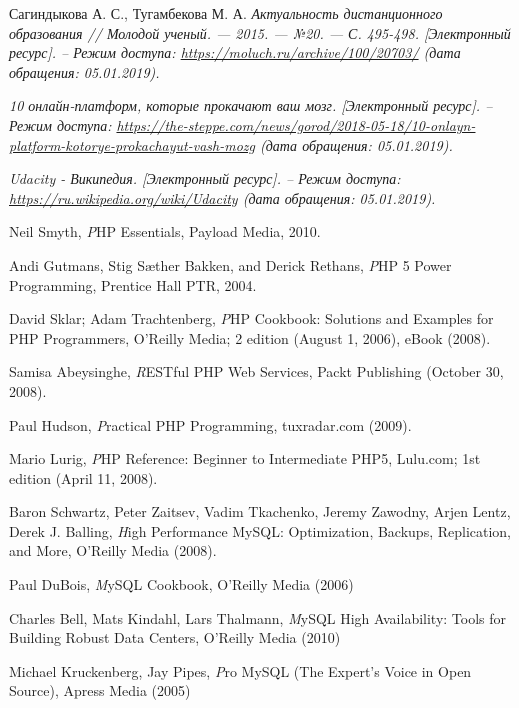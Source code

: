 \begin{thebibliography}{}

Сагиндыкова А. С., Тугамбекова М. А.
\emph{Актуальность дистанционного образования // Молодой ученый. — 2015. — №20. — С. 495-498.
[Электронный ресурс]. – Режим доступа:
\href{https://moluch.ru/archive/100/20703/}{https://moluch.ru/archive/100/20703/}
(дата обращения: 05.01.2019).}

\emph{10 онлайн-платформ, которые прокачают ваш мозг.
[Электронный ресурс]. – Режим доступа:
\href{https://the-steppe.com/news/gorod/2018-05-18/10-onlayn-platform-kotorye-prokachayut-vash-mozg}{https://the-steppe.com/news/gorod/2018-05-18/10-onlayn-platform-kotorye-prokachayut-vash-mozg}
(дата обращения: 05.01.2019).}

\emph{Udacity - Википедия. [Электронный ресурс]. – Режим доступа:
\href{https://ru.wikipedia.org/wiki/Udacity}{https://ru.wikipedia.org/wiki/Udacity}
(дата обращения: 05.01.2019).}




\bibitem{}
Neil Smyth,
\emph PHP Essentials,
Payload Media,
2010.

\bibitem{}
  Andi Gutmans, Stig Sæther Bakken, and Derick Rethans,
  \emph PHP 5 Power Programming,
  Prentice Hall PTR,
  2004.

\bibitem{}
  David Sklar; Adam Trachtenberg,
  \emph PHP Cookbook: Solutions and Examples for PHP Programmers,
  O'Reilly Media; 2 edition (August 1, 2006), eBook (2008).

\bibitem{}
  Samisa Abeysinghe,
  \emph RESTful PHP Web Services,
  Packt Publishing (October 30, 2008).

\bibitem{}
  Paul Hudson,
  \emph Practical PHP Programming,
  tuxradar.com (2009).

\bibitem{}
  Mario Lurig,
  \emph PHP Reference: Beginner to Intermediate PHP5,
  Lulu.com; 1st edition (April 11, 2008).

\bibitem{}
  Baron Schwartz, Peter Zaitsev, Vadim Tkachenko, Jeremy Zawodny, Arjen Lentz, Derek J. Balling,
  \emph High Performance MySQL: Optimization, Backups, Replication, and More,
  O'Reilly Media (2008).


\bibitem{}
  Paul DuBois,
  \emph MySQL Cookbook,
  O'Reilly Media (2006)

\bibitem{}
  Charles Bell, Mats Kindahl, Lars Thalmann,
  \emph MySQL High Availability: Tools for Building Robust Data Centers,
  O'Reilly Media (2010)

\bibitem{}
  Michael Kruckenberg, Jay Pipes,
  \emph Pro MySQL (The Expert's Voice in Open Source),
  Apress Media (2005)


\end{thebibliography}
